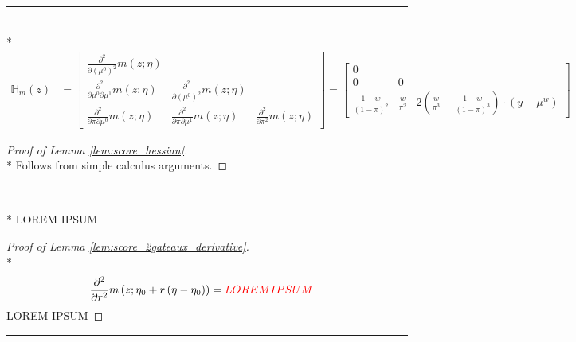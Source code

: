 \hrule

\begin{lem}\label{lem:score_hessian}\mbox{}\\*
    \begin{equation}
        \begin{aligned}
            \mathbb{H}_{m}(z)
            & = \begin{bmatrix}
                \frac{\partial^2}{\partial \left(\mu^{0}\right)^2} m\left(z; \eta\right)   & & \\
                \frac{\partial^2}{\partial \mu^{0} \partial \mu^{1}} m\left(z; \eta\right) & \frac{\partial^2}{\partial \left(\mu^{0}\right)^2} m\left(z; \eta\right) & \\
                \frac{\partial^2}{\partial \pi \partial \mu^{0}} m\left(z; \eta\right)     & \frac{\partial^2}{\partial \pi \partial \mu^{1}} m\left(z; \eta\right) & \frac{\partial^2}{\partial \pi^2} m\left(z; \eta\right)
            \end{bmatrix} 
            = \begin{bmatrix}
                0  & & \\
                0 & 0 & \\
                \frac{1-w}{\left(1-\pi\right)^{2}} & \frac{w}{\pi^2} & 2\left(\frac{w}{\pi^3} - \frac{1-w}{\left(1-\pi\right)^{3}}\right)  \cdot \left(y - \mu^{w}\right)
            \end{bmatrix}
        \end{aligned}
    \end{equation}
\end{lem}

\begin{proof}[Proof of Lemma \ref{lem:score_hessian}]\mbox{}\\*
    Follows from simple calculus arguments.
\end{proof}

\hrule

\begin{lem}\label{lem:score_2gateaux_derivative}\mbox{}\\*
    {\color{red} LOREM IPSUM}
\end{lem}

\begin{proof}[Proof of Lemma \ref{lem:score_2gateaux_derivative}]\mbox{}\\*
    \begin{equation}
        \begin{aligned}
            \frac{\partial^{2}}{\partial r^{2}} m\left(z; \eta_{0} + r\left(\eta - \eta_{0}\right)\right)
            & = {\color{red} LOREM IPSUM}
        \end{aligned}
    \end{equation}
    {\color{red} LOREM IPSUM}
\end{proof}

\hrule
